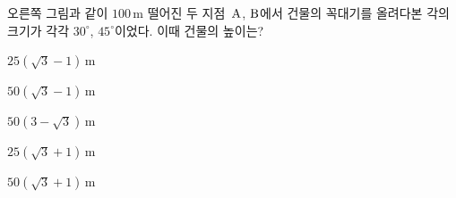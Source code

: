 \noindent\begin{minipage}[t]{0.58\linewidth}\vspace{0pt}\raggedright 오른쪽 그림과 같이 $100\,\mathrm{m}$ 떨어진 두 지점~$\mathrm{A}$, $\mathrm{B}$에서 건물의 꼭대기를 올려다본 각의 크기가 각각 $30^\circ$, $45^\circ$이었다. 이때 건물의 높이는?\end{minipage}\hfill\begin{minipage}[t]{0.4\linewidth}\vspace{0pt}\centering \resizebox{\ifdim\width>\linewidth\linewidth\else\width\fi}{!}{}\end{minipage}\par
\begin{choicesii}{\rule[-3ex]{0pt}{8ex}$25(\sqrt{3}-1)\,\mathrm{m}$}{\rule[-3ex]{0pt}{8ex}$50(\sqrt{3}-1)\,\mathrm{m}$}{\rule[-3ex]{0pt}{8ex}$50(3-\sqrt{3})\,\mathrm{m}$}{\rule[-3ex]{0pt}{8ex}$25(\sqrt{3}+1)\,\mathrm{m}$}{\rule[-3ex]{0pt}{8ex}$50(\sqrt{3}+1)\,\mathrm{m}$}\end{choicesii}
